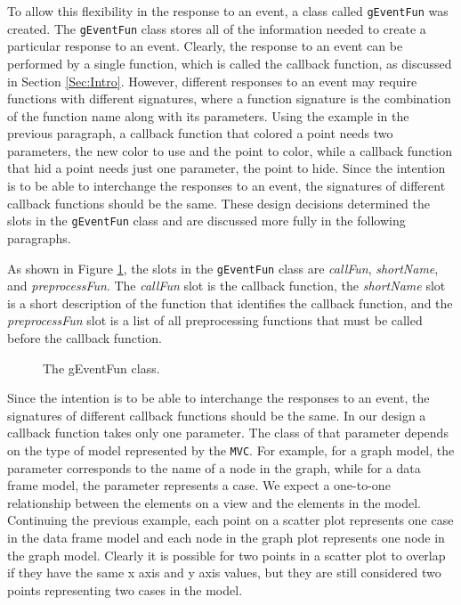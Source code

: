 \documentclass{article}[11pt]
\newcommand{\Robject}[1]{{\texttt{#1}}}
\newcommand{\Rslot}[1]{\textsl{#1}}
\newcommand{\Rclass}[1]{\texttt{#1}}
\begin{document}
To allow this flexibility in the response to an event, a class called
\Rclass{gEventFun} was created.  The \Rclass{gEventFun} class stores all of
the information needed to create a particular response to an event.
Clearly, the response to an event can be performed by a single function,
which is called the callback function, as discussed in Section
\ref{Sec:Intro}.  However, different responses to an event may require
functions with different signatures, where a function signature is the
combination of the function name along with its parameters.  Using the example
in the previous paragraph, a callback function that colored a point needs two
parameters, the new color to use and the point to color, while a callback
function that hid a point needs just one parameter, the point to hide.  Since
the intention is to be able to interchange the responses to an event, the
signatures of different callback functions should be the same.  These design
decisions determined the slots in the \Rclass{gEventFun} class and are
discussed more fully in the following paragraphs. 

As shown in Figure \ref{Fig:EventFun}, the slots in the \Rclass{gEventFun}
class are \Rslot{callFun}, \Rslot{shortName}, and \Rslot{preprocessFun}.  The
\Rslot{callFun} slot is the callback function, the \Rslot{shortName} slot is a
short description of the function that identifies the callback function, and
the \Rslot{preprocessFun} slot is a list of all preprocessing
functions that must be called before the callback function.

\begin{figure}[ht]
  \begin{center}
    \caption{ The gEventFun class. }
    \label{Fig:EventFun}
  \end{center}
\end{figure}

Since the intention is to be able to interchange the responses to an event,
the signatures of different callback functions should be the same.
In our design a callback function takes only one parameter. 
The class of that parameter depends on the type of model represented by the
\Robject{MVC}.  For example, for a graph model, the parameter corresponds to
the name of a node in the graph, while for a data frame model, the parameter
represents a case.  We expect a one-to-one relationship between the elements
on a view and the elements in the model.  Continuing the previous example,
each point on a scatter plot represents one case in the data frame model and
each node in the graph plot represents one node in the graph model.  Clearly
it is possible for two points in a scatter plot to overlap if they have the
same x axis and y axis values, but they are still considered two points
representing two cases in the model.
\end{document}
